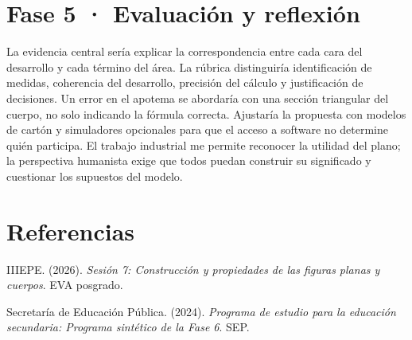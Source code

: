 \documentclass[spanish,letterpaper,oneside]{article}
\begin{document}
\section{Fase 5 · Evaluación y reflexión}
La evidencia central sería explicar la correspondencia entre cada cara del desarrollo y cada término del área. La rúbrica distinguiría identificación de medidas, coherencia del desarrollo, precisión del cálculo y justificación de decisiones. Un error en el apotema se abordaría con una sección triangular del cuerpo, no solo indicando la fórmula correcta.
Ajustaría la propuesta con modelos de cartón y simuladores opcionales para que el acceso a software no determine quién participa. El trabajo industrial me permite reconocer la utilidad del plano; la perspectiva humanista exige que todos puedan construir su significado y cuestionar los supuestos del modelo.

\section*{Referencias}
{\setlength{\parskip}{6pt}
\par\hangindent=1.27cm  IIIEPE. (2026). \textit{Sesión 7: Construcción y propiedades de las figuras planas y cuerpos}. EVA posgrado.
\par\hangindent=1.27cm  Secretaría de Educación Pública. (2024). \textit{Programa de estudio para la educación secundaria: Programa sintético de la Fase 6}. SEP.
}
\end{document}
